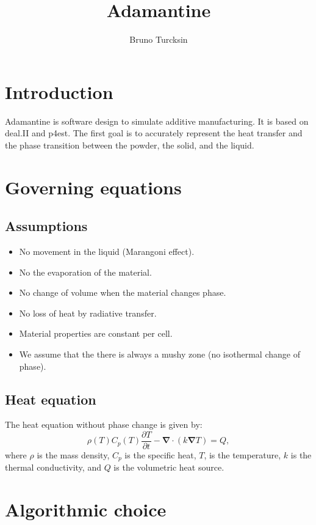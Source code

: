 \documentclass[letterpaper]{article}
\newcommand\bn{\boldsymbol{\nabla}}
\renewcommand{\(}{\left(}
\renewcommand{\)}{\right)}
\renewcommand{\[}{\left[}
\renewcommand{\]}{\right]}
\begin{document}
\title{Adamantine}
\author{Bruno Turcksin} 
\date{}
\maketitle

\section{Introduction}
Adamantine is software design to simulate additive manufacturing. It is based on
deal.II and p4est. The first goal is to accurately represent the heat transfer
and the phase transition between the powder, the solid, and the liquid.

\section{Governing equations}
\subsection{Assumptions}
\begin{itemize}
  \item No movement in the liquid (Marangoni effect).
  \item No the evaporation of the material.
  \item No change of volume when the material changes phase.
  \item No loss of heat by radiative transfer.
  \item Material properties are constant per cell.
  \item We assume that the there is always a mushy zone (no isothermal change
    of phase).
\end{itemize}
\subsection{Heat equation}
The heat equation without phase change is given by:
\begin{equation}
  \rho(T) C_p(T) \frac{\partial T}{\partial t} - \bn \cdot \(k\bn T\) = Q,
\end{equation}
where $\rho$ is the mass density, $C_p$ is the specific heat, $T$, is the
temperature, $k$ is the thermal conductivity, and $Q$ is the volumetric heat
source.


\section{Algorithmic choice}
\end{document}
